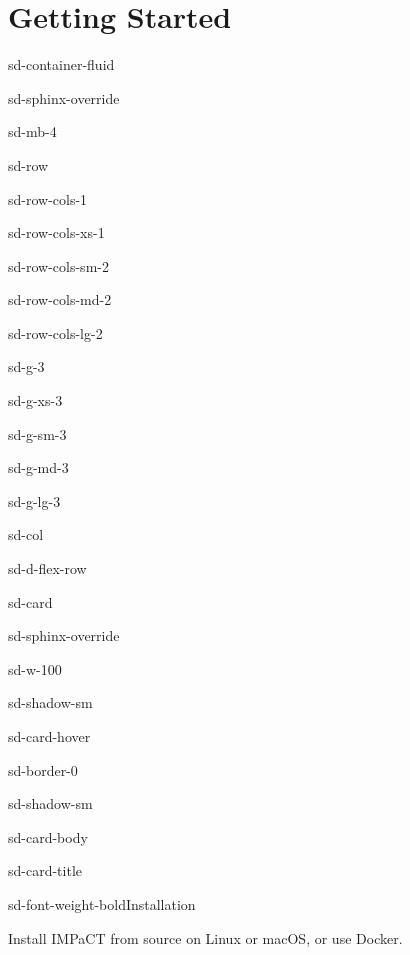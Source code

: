 \documentclass[a4paper,10pt,english]{sphinxmanual}
\begin{document}
\chapter{Getting Started}
\label{\detokenize{index:getting-started}}
\begin{sphinxuseclass}{sd-container-fluid}
\begin{sphinxuseclass}{sd-sphinx-override}
\begin{sphinxuseclass}{sd-mb-4}
\begin{sphinxuseclass}{sd-row}
\begin{sphinxuseclass}{sd-row-cols-1}
\begin{sphinxuseclass}{sd-row-cols-xs-1}
\begin{sphinxuseclass}{sd-row-cols-sm-2}
\begin{sphinxuseclass}{sd-row-cols-md-2}
\begin{sphinxuseclass}{sd-row-cols-lg-2}
\begin{sphinxuseclass}{sd-g-3}
\begin{sphinxuseclass}{sd-g-xs-3}
\begin{sphinxuseclass}{sd-g-sm-3}
\begin{sphinxuseclass}{sd-g-md-3}
\begin{sphinxuseclass}{sd-g-lg-3}
\begin{sphinxuseclass}{sd-col}
\begin{sphinxuseclass}{sd-d-flex-row}
\begin{sphinxuseclass}{sd-card}
\begin{sphinxuseclass}{sd-sphinx-override}
\begin{sphinxuseclass}{sd-w-100}
\begin{sphinxuseclass}{sd-shadow-sm}
\begin{sphinxuseclass}{sd-card-hover}
\begin{sphinxuseclass}{sd-border-0}
\begin{sphinxuseclass}{sd-shadow-sm}
\begin{sphinxuseclass}{sd-card-body}
\begin{sphinxuseclass}{sd-card-title}
\begin{sphinxuseclass}{sd-font-weight-bold}Installation
\end{sphinxuseclass}
\end{sphinxuseclass}
\sphinxAtStartPar
Install IMPaCT from source on Linux or macOS, or use Docker.


\end{sphinxuseclass}
\end{sphinxuseclass}
\end{sphinxuseclass}
\end{sphinxuseclass}
\end{sphinxuseclass}
\end{sphinxuseclass}
\end{sphinxuseclass}
\end{sphinxuseclass}
\end{sphinxuseclass}
\end{sphinxuseclass}
\end{sphinxuseclass}
\end{sphinxuseclass}
\end{sphinxuseclass}
\end{sphinxuseclass}
\end{sphinxuseclass}
\end{sphinxuseclass}
\end{sphinxuseclass}
\end{sphinxuseclass}
\end{sphinxuseclass}
\end{sphinxuseclass}
\end{sphinxuseclass}
\end{sphinxuseclass}
\end{sphinxuseclass}
\end{sphinxuseclass}
\end{document}
